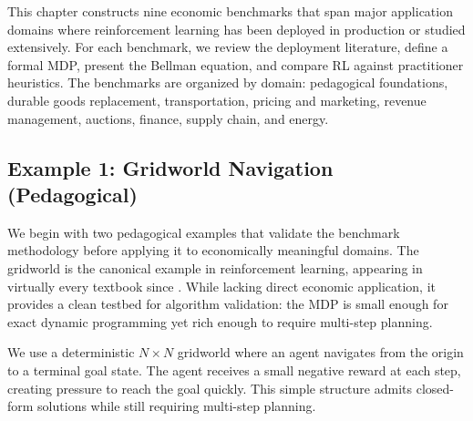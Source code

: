 
This chapter constructs nine economic benchmarks that span major application domains where reinforcement learning has been deployed in production or studied extensively. For each benchmark, we review the deployment literature, define a formal MDP, present the Bellman equation, and compare RL against practitioner heuristics. The benchmarks are organized by domain: pedagogical foundations, durable goods replacement, transportation, pricing and marketing, revenue management, auctions, finance, supply chain, and energy.


\subsection{Example 1: Gridworld Navigation (Pedagogical)}
\label{sec:benchmark_gridworld}

We begin with two pedagogical examples that validate the benchmark methodology before applying it to economically meaningful domains. The gridworld is the canonical example in reinforcement learning, appearing in virtually every textbook since \citet{sutton2018}. While lacking direct economic application, it provides a clean testbed for algorithm validation: the MDP is small enough for exact dynamic programming yet rich enough to require multi-step planning.

We use a deterministic $N \times N$ gridworld where an agent navigates from the origin to a terminal goal state. The agent receives a small negative reward at each step, creating pressure to reach the goal quickly. This simple structure admits closed-form solutions while still requiring multi-step planning.

